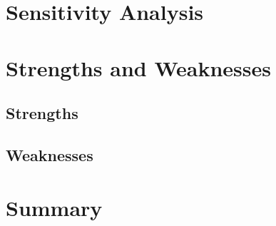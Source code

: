 \documentclass[tcn = 37075, sheet = true, abstract = true]{mcmthesis}
\begin{document}
\section{Sensitivity Analysis}


\section{Strengths and Weaknesses}

\subsection{Strengths}
\subsection{Weaknesses}

\section{Summary}


\end{document}
